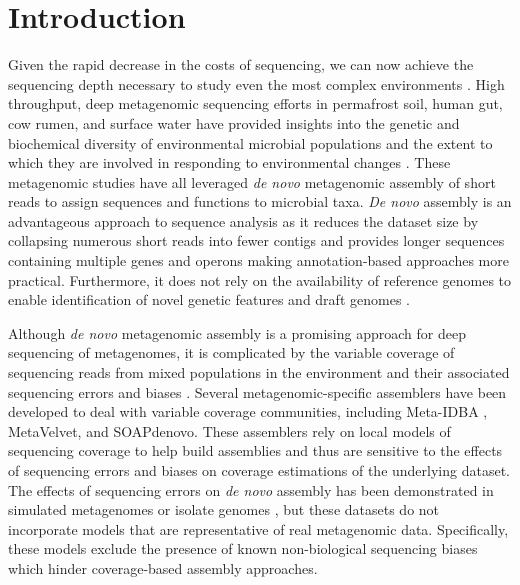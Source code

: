 \documentclass[10pt]{article}
\begin{document}
\section*{Introduction}
Given the rapid decrease in the costs of sequencing, we can now achieve the sequencing depth necessary to study even the most complex environments \cite{Hess:2011p686,Qin:2010p189}.  High throughput, deep metagenomic sequencing efforts in permafrost soil, human gut, cow rumen, and surface water have provided insights into the genetic and biochemical diversity of environmental microbial populations \cite{Hess:2011p686,Iverson:2012p1281,Qin:2010p189} and the extent to which they are involved in responding to environmental changes \cite{Mackelprang:2011p1087}. These metagenomic studies have all leveraged \emph{de novo} metagenomic assembly of short reads to assign sequences and functions to microbial taxa.  \emph{De novo} assembly is an advantageous approach to sequence analysis as it reduces the dataset size by collapsing numerous short reads into fewer contigs and provides longer sequences containing multiple genes and operons \cite{Miller:2010p226,Pop:2009p798} making annotation-based approaches more practical.  Furthermore, it does not rely on the availability of reference genomes to enable identification of novel genetic features and draft genomes \cite{Hess:2011p686,Iverson:2012p1281}.

Although \emph{de novo} metagenomic assembly is a promising approach for deep sequencing of metagenomes, it is complicated by the variable coverage of sequencing reads from mixed populations in the environment and their associated sequencing errors and biases \cite{Mende:2012p1262,Pignatelli:2011p742}. Several metagenomic-specific assemblers have been developed to deal with variable coverage communities, including Meta-IDBA \cite{Peng:2011p898}, MetaVelvet, and SOAPdenovo.  These assemblers rely on local models of sequencing coverage to help build assemblies and thus are sensitive to the effects of sequencing errors and biases on coverage estimations of the underlying dataset. The effects of sequencing errors on \emph{de novo} assembly has been demonstrated in simulated metagenomes \cite{Mavromatis:2006p894,Mende:2012p1262,Pignatelli:2011p742} or isolate genomes \cite{Morgan:2010p740}, but these datasets do not incorporate models that are representative of real metagenomic data.  Specifically, these models exclude the presence of known non-biological sequencing biases \cite{GomezAlvarez:2009p1334,Keegan:2012p1336,Niu:2010p1333} which hinder coverage-based assembly approaches.  
\end{document}
